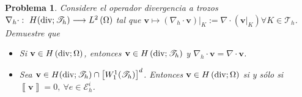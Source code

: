\documentclass[10pt,a4paper]{report}
\newtheorem{pro}{Problema}
\providecommand{\salto}[1]{\left\llbracket#1\right\rrbracket}
\begin{document}
    \begin{pro}
    	Considere el operador divergencia a trozos $\nabla_{h}\cdot:\ H(\textup{div};\mathscr{T}_{h})\longrightarrow L^{2}\left(\Omega\right)$ tal que $\textbf{v}\mapsto \left(\nabla_{h}\cdot \textbf{v}\right)\vert_{K} := \nabla\cdot\left(\textbf{v}\vert_{K}\right)\forall K\in \mathscr{T}_{h}$. Demuestre que
    	\begin{itemize}
    		\item[$(a)$] Si $\textbf{v}\in H\left(\textup{div};\Omega\right)$, entonces $\textbf{v}\in H\left(\textup{div};\mathscr{T}_{h}\right)$ y $\nabla_{h}\cdot \textbf{v} = \nabla\cdot \textbf{v}$.
    		\item[$(b)$] Sea $\textbf{v}\in H(\textup{div};\mathscr{T}_{h})\cap \left[W^{1}_{1}(\mathscr{T}_{h})\right]^{d}$. Entonces $\textbf{v}\in H\left(\textup{div};\Omega\right)$ si y sólo si $\salto{\textbf{v}} = 0,\ \forall e\in \mathscr{E}^{i}_{h}$. 
    	\end{itemize}
    \end{pro}
\end{document}
